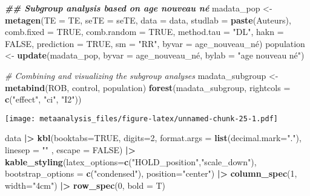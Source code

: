 \documentclass[
]{article}
\newenvironment{Shaded}{\begin{snugshade}}{\end{snugshade}}
\newcommand{\AttributeTok}[1]{\textcolor[rgb]{0.13,0.29,0.53}{#1}}
\newcommand{\CommentTok}[1]{\textcolor[rgb]{0.56,0.35,0.01}{\textit{#1}}}
\newcommand{\ConstantTok}[1]{\textcolor[rgb]{0.56,0.35,0.01}{#1}}
\newcommand{\DecValTok}[1]{\textcolor[rgb]{0.00,0.00,0.81}{#1}}
\newcommand{\DocumentationTok}[1]{\textcolor[rgb]{0.56,0.35,0.01}{\textbf{\textit{#1}}}}
\newcommand{\FunctionTok}[1]{\textcolor[rgb]{0.13,0.29,0.53}{\textbf{#1}}}
\newcommand{\NormalTok}[1]{#1}
\newcommand{\OtherTok}[1]{\textcolor[rgb]{0.56,0.35,0.01}{#1}}
\newcommand{\SpecialCharTok}[1]{\textcolor[rgb]{0.81,0.36,0.00}{\textbf{#1}}}
\newcommand{\StringTok}[1]{\textcolor[rgb]{0.31,0.60,0.02}{#1}}
\begin{document}
\begin{Shaded}
\begin{Highlighting}[]
\DocumentationTok{\#\# Subgroup analysis based on \textquotesingle{}age nouveau né\textquotesingle{}}
\NormalTok{madata\_pop }\OtherTok{\textless{}{-}} \FunctionTok{metagen}\NormalTok{(}\AttributeTok{TE =}\NormalTok{ TE, }\AttributeTok{seTE =}\NormalTok{ seTE, }\AttributeTok{data =}\NormalTok{ data, }\AttributeTok{studlab =} \FunctionTok{paste}\NormalTok{(Auteurs), }
    \AttributeTok{comb.fixed =} \ConstantTok{TRUE}\NormalTok{, }\AttributeTok{comb.random =} \ConstantTok{TRUE}\NormalTok{, }\AttributeTok{method.tau =} \StringTok{"DL"}\NormalTok{, }\AttributeTok{hakn =} \ConstantTok{FALSE}\NormalTok{, }\AttributeTok{prediction =} \ConstantTok{TRUE}\NormalTok{, }
    \AttributeTok{sm =} \StringTok{"RR"}\NormalTok{, }\AttributeTok{byvar =}\NormalTok{ age\_nouveau\_né)}
\NormalTok{population }\OtherTok{\textless{}{-}} \FunctionTok{update}\NormalTok{(madata\_pop, }\AttributeTok{byvar =}\NormalTok{ age\_nouveau\_né, }\AttributeTok{bylab =} \StringTok{"age nouveau né"}\NormalTok{)}



\CommentTok{\# Combining and visualizing the subgroup analyses}
\NormalTok{madata\_subgroup }\OtherTok{\textless{}{-}} \FunctionTok{metabind}\NormalTok{(ROB, control, population)}
\FunctionTok{forest}\NormalTok{(madata\_subgroup, }\AttributeTok{rightcols =} \FunctionTok{c}\NormalTok{(}\StringTok{"effect"}\NormalTok{, }\StringTok{"ci"}\NormalTok{, }\StringTok{"I2"}\NormalTok{))}
\end{Highlighting}
\end{Shaded}

\texttt{[image: metaanalysis\_files/figure-latex/unnamed-chunk-25-1.pdf]}

\begin{Shaded}
\begin{Highlighting}[]
\NormalTok{data }\SpecialCharTok{|\textgreater{}} 
  \FunctionTok{kbl}\NormalTok{(}\AttributeTok{booktabs=}\ConstantTok{TRUE}\NormalTok{,}
      \AttributeTok{digits=}\DecValTok{2}\NormalTok{,}
      \AttributeTok{format.args =} \FunctionTok{list}\NormalTok{(}\AttributeTok{decimal.mark=}\StringTok{"."}\NormalTok{),}
      \AttributeTok{linesep =} \StringTok{""}\NormalTok{ ,}
      \AttributeTok{escape =} \ConstantTok{FALSE}\NormalTok{) }\SpecialCharTok{|\textgreater{}} 
  \FunctionTok{kable\_styling}\NormalTok{(}\AttributeTok{latex\_options=}\FunctionTok{c}\NormalTok{(}\StringTok{"HOLD\_position"}\NormalTok{,}\StringTok{"scale\_down"}\NormalTok{), }\AttributeTok{bootstrap\_options =} \FunctionTok{c}\NormalTok{(}\StringTok{"condensed"}\NormalTok{), }\AttributeTok{position=}\StringTok{"center"}\NormalTok{) }\SpecialCharTok{|\textgreater{}}
  \FunctionTok{column\_spec}\NormalTok{(}\DecValTok{1}\NormalTok{, }\AttributeTok{width=}\StringTok{"4cm"}\NormalTok{) }\SpecialCharTok{|\textgreater{}} 
  \FunctionTok{row\_spec}\NormalTok{(}\DecValTok{0}\NormalTok{, }\AttributeTok{bold =}\NormalTok{ T)}
\end{Highlighting}
\end{Shaded}
\end{document}
